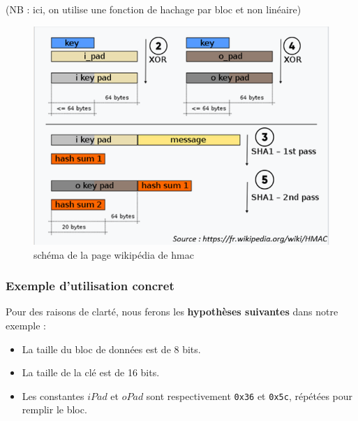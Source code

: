 \documentclass[a4paper, 10pt]{article}
\begin{document}
(NB : ici, on utilise une fonction de \textcolor{myblue}{hachage par bloc} et non linéaire)

\begin{figure}[H]
        \centering
        \includegraphics[scale=0.4]{img/2/hmac-wiki.png}
        \caption{schéma de la page wikipédia de hmac}
        \label{fig:hotp-resync}
\end{figure}

\emph{}

        \subsubsection{Exemple d'utilisation concret}

\noindent
Pour des raisons de clarté, nous ferons les \textbf{ hypothèses suivantes} dans notre exemple :
\begin{itemize}
    \item La taille du bloc de données est de 8 bits.
    \item La taille de la clé est de 16 bits.
    \item Les constantes $iPad$ et $oPad$ sont respectivement \texttt{0x36} et \texttt{0x5c}, répétées pour remplir le bloc.\\
\end{itemize}
\end{document}
